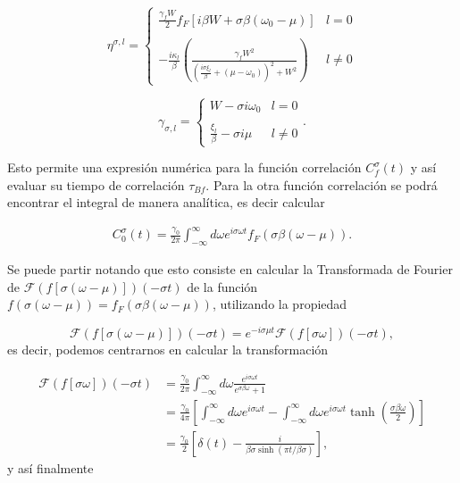 \begin{appendixs}
\begin{equation*}
    \eta^{\sigma,l} = \left\{ \begin{array}{lc} \frac{\gamma_{f}W}{2} f_{F}[i\beta W + \sigma \beta (\omega_{0}-\mu)]  & l = 0 \\ \\ - \frac{i\kappa_{l}}{\beta} \left(\frac{\gamma_{f}W^{2}}{ (\frac{i\sigma \xi_{l}}{\beta} + (\mu-\omega_{0}))^{2} + W^{2} } \right) &  l \neq 0 \end{array} \right.
\end{equation*}

\begin{equation*}
    \gamma_{\sigma,l} =  \left\{ \begin{array}{lc} W- \sigma i \omega_{0}  & l = 0 \\ \\ \frac{\xi_{l}}{\beta} - \sigma i \mu &  l \neq 0 \end{array} \right..
\end{equation*}

Esto permite una expresión numérica para la función correlación $C^{\sigma}_{f}(t)$ y así evaluar su tiempo de correlación $\tau_{Bf}$. Para la otra función correlación se podrá encontrar el integral de manera analítica, es decir calcular

\begin{align*}
       C_{0}^{\sigma}(t) = \frac{\gamma_{0}}{2\pi} \int_{-\infty}^{\infty} d\omega e^{i\sigma \omega t }f_{F}(\sigma \beta (\omega -  \mu)).
\end{align*}    

Se puede partir notando que esto consiste en calcular la Transformada de Fourier de $\mathcal{F}(f[\sigma (\omega - \mu)])(-\sigma t)$ de la función $f(\sigma(\omega-\mu))= f_{F}(\sigma \beta (\omega-\mu) )$, utilizando la propiedad

\begin{equation*}
\mathcal{F}(f[\sigma (\omega - \mu)])(-\sigma t) = e^{-i \sigma \mu t}\mathcal{F}(f[\sigma \omega])(-\sigma t),
\end{equation*}
es decir, podemos centrarnos en calcular la transformación

\begin{align*}
    \mathcal{F}(f[\sigma \omega])(-\sigma t) &= \frac{\gamma_{0}}{2\pi} \int_{-\infty}^{\infty} d\omega \frac{e^{i\sigma \omega t}}{e^{\sigma \beta \omega} +1 } \\
        & = \frac{\gamma_{0}}{4\pi} \left[\int_{-\infty}^{\infty}d \omega e^{i\sigma \omega t} - \int_{-\infty}^{\infty}d\omega e^{i\sigma \omega t} \tanh \left(\frac{ \sigma \beta \omega }{2} \right)   \right] \\
        & =  \frac{\gamma_{0}}{2} \left[\delta(t) - \frac{i}{\beta \sigma \sinh(\pi t/\beta \sigma)} \right],
\end{align*}
y así finalmente


\end{appendixs}

